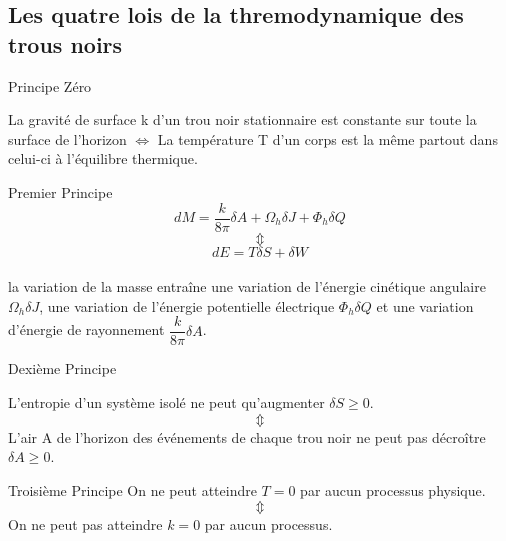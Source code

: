 \documentclass{beamer}
\begin{document}
\subsection{Les quatre lois de la thremodynamique des trous noirs}
\begin{frame}
\begin{block}{Principe Zéro}
	
	La gravité de surface k d'un trou noir stationnaire est constante sur toute la surface de	l'horizon $ \Leftrightarrow$ La température T d'un corps est la m\^{e}me partout dans celui-ci  
	à l'équilibre thermique. 

\end{block}
\begin{block}{Premier Principe}
	$$dM=\dfrac{k}{8\pi}\delta A+\Omega_{h}\delta J+\Phi_{h}\delta Q$$ $$\Updownarrow$$  $$dE = T\delta S +\delta W$$
	 \\ 
	la variation de la masse entraîne une variation de l'énergie cinétique angulaire $\Omega_{h}\delta J$, une variation de l'énergie potentielle électrique $\Phi_{h}\delta Q$ et une variation d'énergie de rayonnement $\dfrac{k}{8\pi}\delta A$.
\end{block}

\end{frame}

\begin{frame}
\begin{block}{Dexième Principe}
	
	 L'entropie d'un système isolé ne peut qu'augmenter $\delta S \geq 0$.$$\Updownarrow$$ L'air A de l'horizon des événements de chaque trou noir ne peut pas décroître $\delta A\geq 0$. 
	
\end{block}
\begin{block}{Troisième Principe}
	On ne peut atteindre $T = 0$ par aucun processus physique.$$\Updownarrow$$ On ne peut pas atteindre $k = 0$ par aucun processus.
\end{block}

\end{frame}
\end{document}

